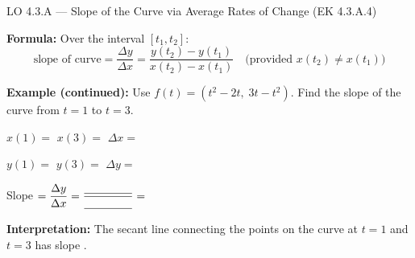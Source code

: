 \documentclass[10pt]{article}
\begin{document}
\begin{notesbox}{LO 4.3.A --- Slope of the Curve via Average Rates of Change (EK 4.3.A.4)}

\textbf{Formula:} Over the interval $[t_1, t_2]$:
\[
  \text{slope of curve} = \frac{\Delta y}{\Delta x}
  = \frac{y(t_2) - y(t_1)}{x(t_2) - x(t_1)}
  \quad \text{(provided } x(t_2) \ne x(t_1)\text{)}
\]

\vspace{6pt}
\textbf{Example (continued):} Use $f(t) = (t^2 - 2t,\; 3t - t^2)$.
Find the slope of the curve from $t = 1$ to $t = 3$.

\vspace{6pt}
$x(1) = $ \blank{1.5cm} \qquad $x(3) = $ \blank{1.5cm} \qquad $\Delta x = $ \blank{1.5cm}

$y(1) = $ \blank{1.5cm} \qquad $y(3) = $ \blank{1.5cm} \qquad $\Delta y = $ \blank{1.5cm}

\vspace{6pt}
Slope $= \dfrac{\Delta y}{\Delta x} = \dfrac{\blank{1.5cm}}{\blank{1.5cm}} = $ \blank{1.5cm}

\vspace{6pt}
\textbf{Interpretation:} The secant line connecting the points on the
curve at $t = 1$ and $t = 3$ has slope \blank{1.5cm}.

\end{notesbox}
\end{document}
